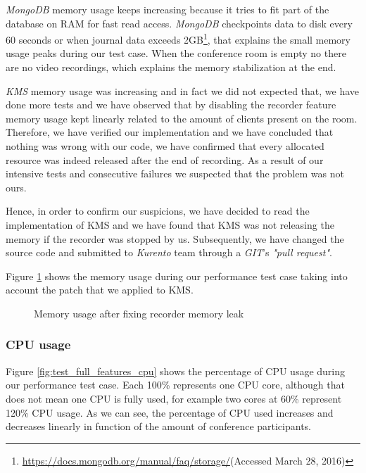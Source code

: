 \emph{MongoDB} memory usage keeps increasing because it tries to fit part of the database on \ac{RAM} for fast read access. \emph{MongoDB} checkpoints data to disk every 60 seconds or when journal data exceeds 2GB\footnote{\url{https://docs.mongodb.org/manual/faq/storage/}(Accessed March 28, 2016)}, that explains the small memory usage peaks during our test case. When the conference room is empty no there are no video recordings, which explains the memory stabilization at the end.

\emph{KMS} memory usage was increasing and in fact we did not expected that, we have done more tests and we have observed that by disabling the recorder feature memory usage kept linearly related to the amount of clients present on the room. Therefore, we have verified our implementation and we have concluded that nothing was wrong with our code, we have confirmed that every allocated resource was indeed released after the end of recording. As a result of our intensive tests and consecutive failures we suspected that the problem was not ours.

Hence, in order to confirm our suspicions, we have decided to read the implementation of \ac{KMS} and we have found that \ac{KMS} was not releasing the memory if the recorder was stopped by us. Subsequently, we have changed the source code and submitted to \emph{Kurento} team through a \emph{GIT}'s \emph{"pull request"}.


Figure \ref{fig:test_ram_fixed_mem} shows the memory usage during our performance test case taking into account the patch that we applied to \ac{KMS}.

\begin{figure}[!htb]
  \begin{center}
    
  \end{center}
  \caption{Memory usage after fixing recorder memory leak}
  \label{fig:test_ram_fixed_mem}
\end{figure}

\subsubsection{CPU usage}


Figure \ref{fig:test_full_features_cpu} shows the percentage of \ac{CPU} usage during our performance test case. Each 100\% represents one \ac{CPU} core, although that does not mean one \ac{CPU} is fully used, for example two cores at 60\% represent 120\% \ac{CPU} usage. As we can see, the percentage of \ac{CPU} used increases and decreases linearly in function of the amount of conference participants. 

